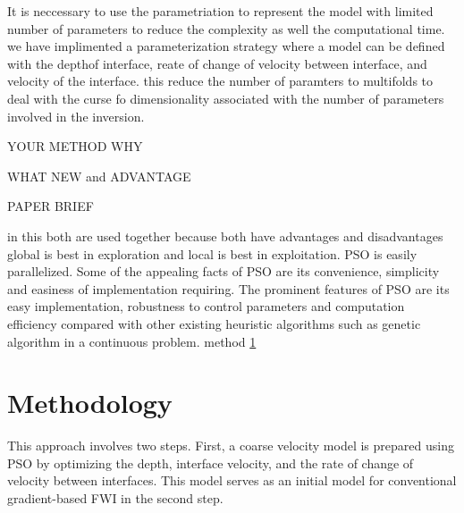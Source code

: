 \documentclass[paper,revised]{geophysics}
\begin{document}
\par
It is neccessary to use the parametriation to represent the model with limited number of parameters to reduce the complexity as well the computational time. we have implimented a parameterization strategy where a model can be defined with the depthof interface, reate of change of velocity between interface, and velocity of the interface. this reduce the number of paramters to multifolds to deal with the curse fo dimensionality associated with the number of parameters involved in the inversion.
\par
YOUR METHOD WHY
\par
WHAT NEW and ADVANTAGE
\par
PAPER BRIEF



 in this both are used together because both have advantages and disadvantages global is best in exploration and local is best in exploitation. PSO is easily parallelized.
Some of the appealing facts of PSO are its convenience, simplicity and easiness of implementation requiring.
The prominent features of PSO are its easy implementation, robustness to control parameters and computation efficiency compared with other existing heuristic algorithms such as genetic algorithm in a continuous problem.
method \ref{method}
\section{Methodology}
\label{method}
This approach involves two steps. First, a coarse velocity model is prepared using PSO by optimizing the depth, interface velocity, and the rate of change of velocity between interfaces. This model serves as an initial model for conventional gradient-based FWI in the second step.
\end{document}
